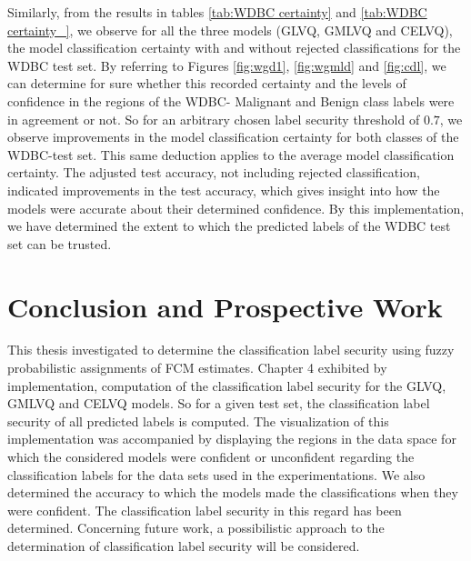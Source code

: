 \documentclass[english]{HSMW-Thesis}
\begin{document}
Similarly, from the results in tables \ref{tab:WDBC certainty} and \ref{tab:WDBC certainty_}, we observe for all the three models (GLVQ, GMLVQ and CELVQ), the model classification certainty with and without rejected classifications for the WDBC test set. By referring to Figures \ref{fig:wgd1}, \ref{fig:wgmld} and \ref{fig:cdl}, we can determine for sure whether this recorded certainty and the levels of confidence in the regions of the WDBC- Malignant and Benign class labels were in agreement or not. So for an arbitrary chosen label security threshold of\hspace{2pt} $0.7$, we observe improvements in the model classification certainty for both classes of the WDBC-test set. This same deduction applies to the average model classification certainty. The adjusted test accuracy, not including rejected classification, indicated improvements in the test accuracy, which gives insight into how the models were accurate about their determined confidence.
By this implementation, we have determined the extent to which the predicted labels of the WDBC test set can be trusted.


\chapter{Conclusion and Prospective Work}
This thesis investigated to determine the classification label security using fuzzy probabilistic assignments of FCM estimates. Chapter 4 exhibited by implementation, computation of the classification label security for the GLVQ, GMLVQ and CELVQ models. So for a given test set, the classification label security of all predicted labels is computed. The visualization of this implementation was accompanied by displaying the regions in the data space for which the considered models were confident or unconfident regarding the classification labels for the data sets used in the experimentations. We also determined the accuracy to which the models made the classifications when they were confident. The classification label security in this regard has been determined.
Concerning future work, a possibilistic approach to the determination of classification label security will be considered.
\end{document}

